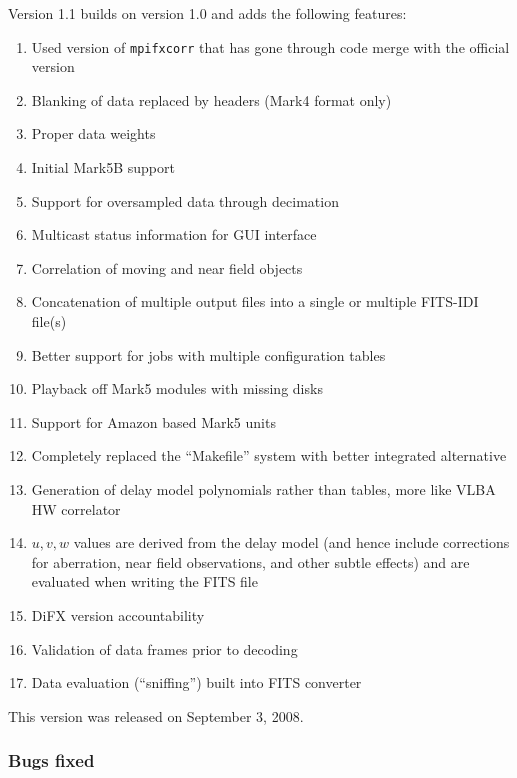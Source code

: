 Version 1.1 builds on version 1.0 and adds the following features:
\begin{enumerate}
\item Used version of {\tt mpifxcorr} that has gone through code merge with the official version
\item Blanking of data replaced by headers (Mark4 format only)
\item Proper data weights
\item Initial Mark5B support
\item Support for oversampled data through decimation
\item Multicast status information for GUI interface
\item Correlation of moving and near field objects
\item Concatenation of multiple output files into a single or multiple FITS-IDI file(s)
\item Better support for jobs with multiple configuration tables
\item Playback off Mark5 modules with missing disks
\item Support for Amazon based Mark5 units
\item Completely replaced the ``Makefile'' system with better integrated alternative
\item Generation of delay model polynomials rather than tables, more like VLBA HW correlator
\item $u, v, w$ values are derived from the delay model (and hence include corrections for aberration, near field observations, and other subtle effects) and are evaluated when writing the FITS file
\item DiFX version accountability
\item Validation of data frames prior to decoding
\item Data evaluation (``sniffing'') built into FITS converter
\end{enumerate}
This version was released on September 3, 2008.

\subsubsection{Bugs fixed}

